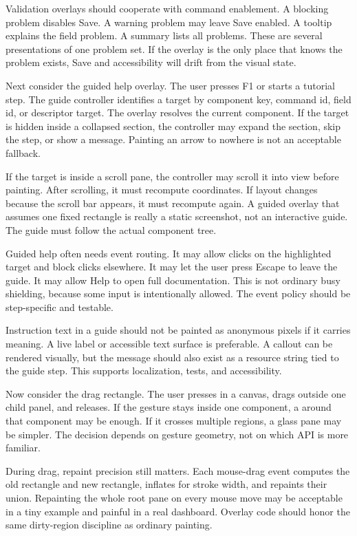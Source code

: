 Validation overlays should cooperate with command enablement. A blocking problem disables Save. A warning problem may leave Save enabled. A tooltip explains the field problem. A summary lists all problems. These are several presentations of one problem set. If the overlay is the only place that knows the problem exists, Save and accessibility will drift from the visual state.

Next consider the guided help overlay. The user presses F1 or starts a tutorial step. The guide controller identifies a target by component key, command id, field id, or descriptor target. The overlay resolves the current component. If the target is hidden inside a collapsed section, the controller may expand the section, skip the step, or show a message. Painting an arrow to nowhere is not an acceptable fallback.

If the target is inside a scroll pane, the controller may scroll it into view before painting. After scrolling, it must recompute coordinates. If layout changes because the scroll bar appears, it must recompute again. A guided overlay that assumes one fixed rectangle is really a static screenshot, not an interactive guide. The guide must follow the actual component tree.

Guided help often needs event routing. It may allow clicks on the highlighted target and block clicks elsewhere. It may let the user press Escape to leave the guide. It may allow Help to open full documentation. This is not ordinary busy shielding, because some input is intentionally allowed. The event policy should be step-specific and testable.

Instruction text in a guide should not be painted as anonymous pixels if it carries meaning. A live label or accessible text surface is preferable. A callout can be rendered visually, but the message should also exist as a resource string tied to the guide step. This supports localization, tests, and accessibility.

Now consider the drag rectangle. The user presses in a canvas, drags outside one child panel, and releases. If the gesture stays inside one component, a  around that component may be enough. If it crosses multiple regions, a glass pane may be simpler. The decision depends on gesture geometry, not on which API is more familiar.

During drag, repaint precision still matters. Each mouse-drag event computes the old rectangle and new rectangle, inflates for stroke width, and repaints their union. Repainting the whole root pane on every mouse move may be acceptable in a tiny example and painful in a real dashboard. Overlay code should honor the same dirty-region discipline as ordinary painting.

